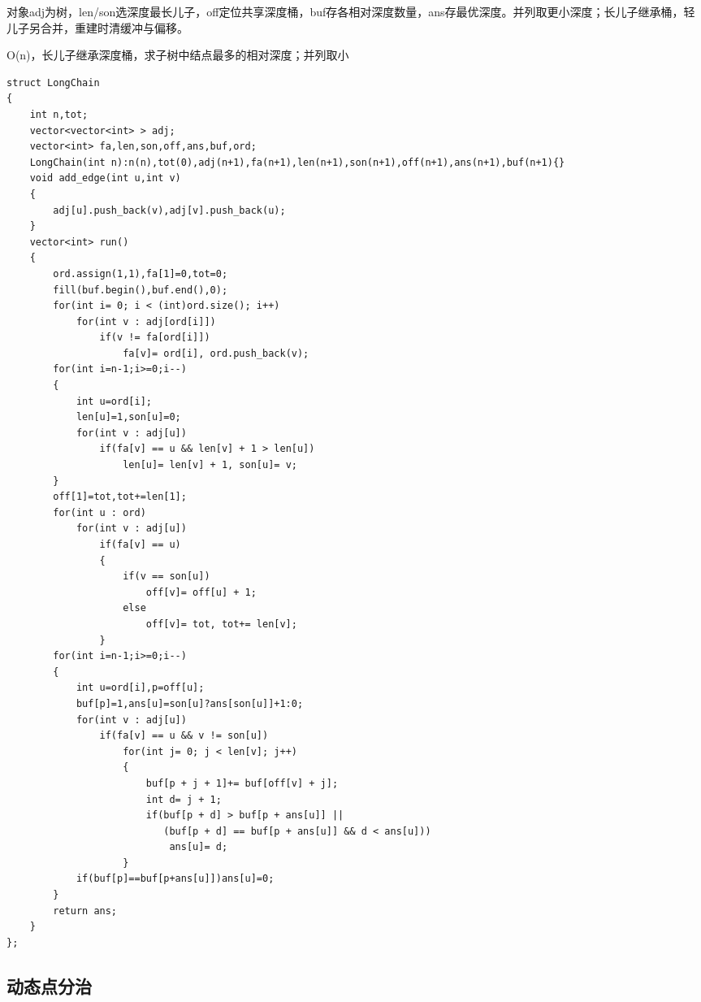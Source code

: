 \documentclass[UTF8,fontset=fandol,a4paper,twoside]{ctexart}
\newcommand{\note}[1]{{\fontsize{10}{12}\selectfont #1\par}}
\begin{document}
\begin{multicols}{2}
\note{对象adj为树，len/\allowbreak{}son选深度最长儿子，off定位共享深度桶，buf存各相对深度数量，ans存最优深度。并列取更小深度；长儿子继承桶，轻儿子另合并，重建时清缓冲与偏移。}
\note{O(\allowbreak{}n)\allowbreak{}，长儿子继承深度桶，求子树中结点最多的相对深度；并列取小}
\begin{lstlisting}
struct LongChain
{
    int n,tot;
    vector<vector<int> > adj;
    vector<int> fa,len,son,off,ans,buf,ord;
    LongChain(int n):n(n),tot(0),adj(n+1),fa(n+1),len(n+1),son(n+1),off(n+1),ans(n+1),buf(n+1){}
    void add_edge(int u,int v)
    {
        adj[u].push_back(v),adj[v].push_back(u);
    }
    vector<int> run()
    {
        ord.assign(1,1),fa[1]=0,tot=0;
        fill(buf.begin(),buf.end(),0);
        for(int i= 0; i < (int)ord.size(); i++)
            for(int v : adj[ord[i]])
                if(v != fa[ord[i]])
                    fa[v]= ord[i], ord.push_back(v);
        for(int i=n-1;i>=0;i--)
        {
            int u=ord[i];
            len[u]=1,son[u]=0;
            for(int v : adj[u])
                if(fa[v] == u && len[v] + 1 > len[u])
                    len[u]= len[v] + 1, son[u]= v;
        }
        off[1]=tot,tot+=len[1];
        for(int u : ord)
            for(int v : adj[u])
                if(fa[v] == u)
                {
                    if(v == son[u])
                        off[v]= off[u] + 1;
                    else
                        off[v]= tot, tot+= len[v];
                }
        for(int i=n-1;i>=0;i--)
        {
            int u=ord[i],p=off[u];
            buf[p]=1,ans[u]=son[u]?ans[son[u]]+1:0;
            for(int v : adj[u])
                if(fa[v] == u && v != son[u])
                    for(int j= 0; j < len[v]; j++)
                    {
                        buf[p + j + 1]+= buf[off[v] + j];
                        int d= j + 1;
                        if(buf[p + d] > buf[p + ans[u]] ||
                           (buf[p + d] == buf[p + ans[u]] && d < ans[u]))
                            ans[u]= d;
                    }
            if(buf[p]==buf[p+ans[u]])ans[u]=0;
        }
        return ans;
    }
};
\end{lstlisting}
\subsection{动态点分治}


\end{multicols}
\end{document}
